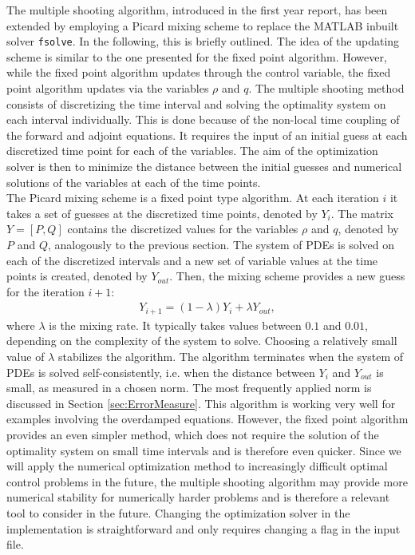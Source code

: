 
The multiple shooting algorithm, introduced in the first year report, has been extended by employing a Picard mixing scheme to replace the {\scshape MATLAB} inbuilt solver \texttt{fsolve}. In the following, this is briefly outlined.
The idea of the updating scheme is similar to the one presented for the fixed point algorithm. However, while the fixed point algorithm updates through the control variable, the fixed point algorithm updates via the variables $\rho$ and $q$.
The multiple shooting method consists of discretizing the time interval and solving the optimality system on each interval individually. This is done because of the non-local time coupling of the forward and adjoint equations. It requires the input of an initial guess at each discretized time point for each of the variables. The aim of the optimization solver is then to minimize the distance between the initial guesses and numerical solutions of the variables at each of the time points. \\
The Picard mixing scheme is a fixed point type algorithm. At each iteration $i$ it takes a set of guesses at the discretized time points, denoted by $Y_i$. The matrix $Y = [P,Q]$ contains the discretized values for the variables $\rho$ and $q$, denoted by $P$ and $Q$, analogously to the previous section.  
The system of PDEs is solved on each of the discretized intervals and a new set of variable values at the time points is created, denoted by $Y_{out}$. Then, the mixing scheme provides a new guess for the iteration $i+1$:
\begin{align*}
Y_{i+1} = (1 - \lambda)Y_i + \lambda Y_{out},
\end{align*}
where $\lambda$ is the mixing rate. It typically takes values between $0.1$ and $0.01$, depending on the complexity of the system to solve. Choosing a relatively small value of $\lambda$ stabilizes the algorithm. 
The algorithm terminates when the system of PDEs is solved self-consistently, i.e. when the distance between $Y_i$ and $Y_{out}$ is small, as measured in a chosen norm. The most frequently applied norm is discussed in Section \ref{sec:ErrorMeasure}.
This algorithm is working very well for examples involving the overdamped equations. However, the fixed point algorithm provides an even simpler method, which does not require the solution of the optimality system on small time intervals and is therefore even quicker. Since we will apply the numerical optimization method to increasingly difficult optimal control problems in the future, the multiple shooting algorithm may provide more numerical stability for numerically harder problems and is therefore a relevant tool to consider in the future. Changing the optimization solver in the implementation is straightforward and only requires changing a flag in the input file.
